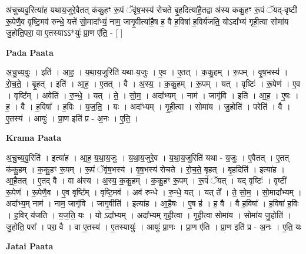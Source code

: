 \documentclass[17pt]{extarticle}
\begin{document}
अ॑चुच्यवु॒रित्या॑ह यथाय॒जुरे॒वैतत् क॑कु॒हꣳ रू॒पं ॅवृ॑ष॒भस्य॑ रोचते बृ॒हदित्या॑है॒तद्वा अ॑स्य ककु॒हꣳ रू॒पं ॅयद्-वृष्टी॑ रू॒पेणै॒व वृष्टि॒मव॑ रुन्धे॒ यत्ते॑ सो॒मादा᳚भ्यं॒ नाम॒ जागृ॒वीत्या॑है॒ष ह॒ वै ह॒विषा॑ ह॒विर्य॑जति॒ योऽदा᳚भ्यं गृही॒त्वा सोमा॑य जु॒होति॒परा॒ वा ए॒तस्याऽऽ*युः॑ प्रा॒ण ए॑ति॒ - [  ] \newline

\textbf{Pada Paata} \newline

अ॒चु॒च्य॒वुः॒ । इति॑ । आ॒ह॒ । य॒था॒य॒जुरिति॑ यथा-य॒जुः । ए॒व । ए॒तत् । क॒कु॒हम् । रू॒पम् । वृ॒ष॒भस्य॑ । रो॒च॒ते॒ । बृ॒हत् । इति॑ । आ॒ह॒ । ए॒तत् । वै । अ॒स्य॒ । क॒कु॒हम् । रू॒पम् । यत् । वृष्टिः॑ । रू॒पेण॑ । ए॒व । वृष्टि᳚म् । अवेति॑ । रु॒न्धे॒ । यत् । ते॒ । सो॒म॒ । अदा᳚भ्यम् । नाम॑ । जागृ॑वि । इति॑ । आ॒ह॒ । ए॒षः । ह॒ । वै । ह॒विषा᳚ । ह॒विः । य॒ज॒ति॒ । यः । अदा᳚भ्यम् । गृ॒ही॒त्वा । सोमा॑य । जु॒होति॑ । परेति॑ । वै । ए॒तस्य॑ । आयुः॑ । प्रा॒ण इति॑ प्र - अ॒नः । ए॒ति॒ ।  \newline


\textbf{Krama Paata} \newline

अ॒चु॒च्य॒वु॒रिति॑ । इत्या॑ह । आ॒ह॒ य॒था॒य॒जुः । य॒था॒य॒जुरे॒व । य॒था॒य॒जुरिति॑ यथा - य॒जुः । ए॒वैतत् । ए॒तत् क॑कु॒हम् । क॒कु॒हꣳ रू॒पम् । रू॒पं ॅवृ॑ष॒भस्य॑ । वृ॒ष॒भस्य॑ रोचते । रो॒च॒ते॒ बृ॒हत् । बृ॒हदिति॑ । इत्या॑ह । आ॒है॒तत् । ए॒तद् वै । वा अ॑स्य । अ॒स्य॒ क॒कु॒हम् । क॒कु॒हꣳ रू॒पम् । रू॒पं ॅयत् । यद् वृष्टिः॑ । वृष्टी॑ रू॒पेण॑ । रू॒पेणै॒व । ए॒व वृष्टि᳚म् । वृष्टि॒मव॑ । अव॑ रुन्धे । रु॒न्धे॒ यत् । यत् ते᳚ । ते॒ सो॒म॒ । सो॒मादा᳚भ्यम् । अदा᳚भ्य॒म् नाम॑ । नाम॒ जागृ॑वि । जागृ॒वीति॑ । इत्या॑ह । आ॒है॒षः । ए॒ष ह॑ । ह॒ वै । वै ह॒विषा᳚ । ह॒विषा॑ ह॒विः । ह॒विर् य॑जति । य॒ज॒ति॒ यः । यो ऽदा᳚भ्यम् । अदा᳚भ्यम् गृही॒त्वा । गृ॒ही॒त्वा सोमा॑य । सोमा॑य जु॒होति॑ । जु॒होति॒ परा᳚ । परा॒ वै । वा ए॒तस्य॑ । ए॒तस्यायुः॑ । आयुः॑ प्रा॒णः । प्रा॒ण ए॑ति । प्रा॒ण इति॑ प्र - अ॒नः । ए॒ति॒ यः \newline

\textbf{Jatai Paata} \newline
\end{document}
